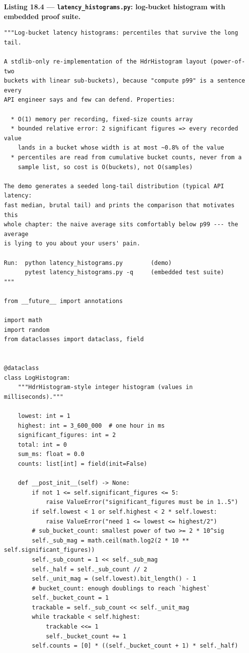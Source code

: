 \noindent\textbf{Listing 18.4 --- \texttt{latency\_histograms.py}: log-bucket
histogram with embedded proof suite.}
\label{lst:ch18-histograms}
\begin{verbatim}
"""Log-bucket latency histograms: percentiles that survive the long tail.

A stdlib-only re-implementation of the HdrHistogram layout (power-of-two
buckets with linear sub-buckets), because "compute p99" is a sentence every
API engineer says and few can defend. Properties:

  * O(1) memory per recording, fixed-size counts array
  * bounded relative error: 2 significant figures => every recorded value
    lands in a bucket whose width is at most ~0.8% of the value
  * percentiles are read from cumulative bucket counts, never from a
    sample list, so cost is O(buckets), not O(samples)

The demo generates a seeded long-tail distribution (typical API latency:
fast median, brutal tail) and prints the comparison that motivates this
whole chapter: the naive average sits comfortably below p99 --- the average
is lying to you about your users' pain.

Run:  python latency_histograms.py        (demo)
      pytest latency_histograms.py -q     (embedded test suite)
"""

from __future__ import annotations

import math
import random
from dataclasses import dataclass, field


@dataclass
class LogHistogram:
    """HdrHistogram-style integer histogram (values in milliseconds)."""

    lowest: int = 1
    highest: int = 3_600_000  # one hour in ms
    significant_figures: int = 2
    total: int = 0
    sum_ms: float = 0.0
    counts: list[int] = field(init=False)

    def __post_init__(self) -> None:
        if not 1 <= self.significant_figures <= 5:
            raise ValueError("significant_figures must be in 1..5")
        if self.lowest < 1 or self.highest < 2 * self.lowest:
            raise ValueError("need 1 <= lowest <= highest/2")
        # sub_bucket_count: smallest power of two >= 2 * 10^sig
        self._sub_mag = math.ceil(math.log2(2 * 10 ** self.significant_figures))
        self._sub_count = 1 << self._sub_mag
        self._half = self._sub_count // 2
        self._unit_mag = (self.lowest).bit_length() - 1
        # bucket_count: enough doublings to reach `highest`
        self._bucket_count = 1
        trackable = self._sub_count << self._unit_mag
        while trackable < self.highest:
            trackable <<= 1
            self._bucket_count += 1
        self.counts = [0] * ((self._bucket_count + 1) * self._half)


\end{verbatim}
